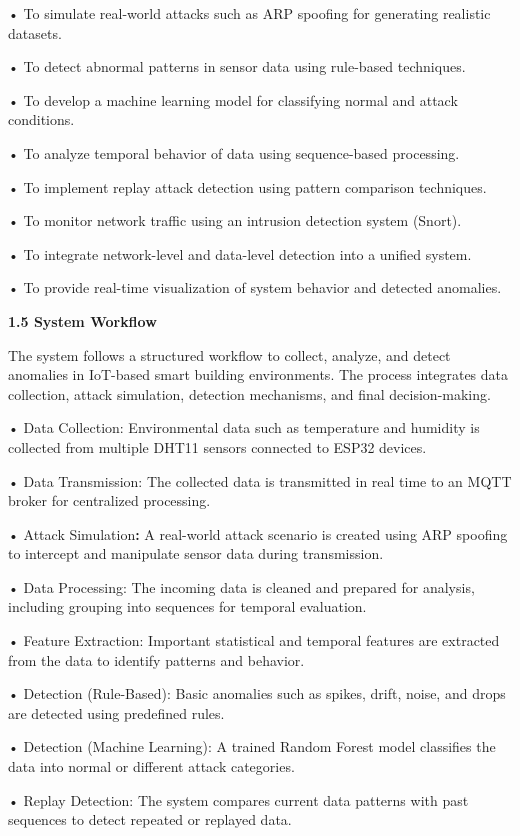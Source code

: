 • To simulate real-world attacks such as ARP spoofing for generating
realistic datasets.

• To detect abnormal patterns in sensor data using rule-based
techniques.

• To develop a machine learning model for classifying normal and attack
conditions.

• To analyze temporal behavior of data using sequence-based processing.

• To implement replay attack detection using pattern comparison
techniques.

• To monitor network traffic using an intrusion detection system
(Snort).

• To integrate network-level and data-level detection into a unified
system.

• To provide real-time visualization of system behavior and detected
anomalies.

\textbf{1.5 System Workflow}

The system follows a structured workflow to collect, analyze, and detect
anomalies in IoT-based smart building environments. The process
integrates data collection, attack simulation, detection mechanisms, and
final decision-making.

• Data Collection: Environmental data such as temperature and humidity
is collected from multiple DHT11 sensors connected to ESP32 devices.

• Data Transmission: The collected data is transmitted in real time to
an MQTT broker for centralized processing.

• Attack Simulation\textbf{:} A real-world attack scenario is created
using ARP spoofing to intercept and manipulate sensor data during
transmission.

• Data Processing: The incoming data is cleaned and prepared for
analysis, including grouping into sequences for temporal evaluation.

• Feature Extraction: Important statistical and temporal features are
extracted from the data to identify patterns and behavior.

• Detection (Rule-Based): Basic anomalies such as spikes, drift, noise,
and drops are detected using predefined rules.

• Detection (Machine Learning): A trained Random Forest model classifies
the data into normal or different attack categories.

• Replay Detection: The system compares current data patterns with past
sequences to detect repeated or replayed data.

